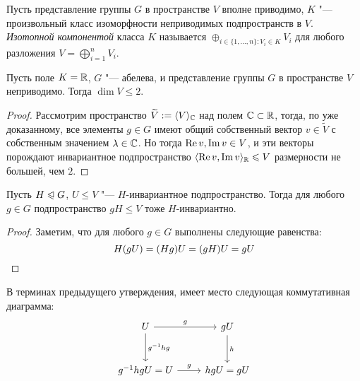 \begin{definition}
	Пусть представление группы $G$ в пространстве $V$ вполне приводимо, $K$ "--- произвольный класс изоморфности неприводимых подпространств в $V$. \textit{Изотопной компонентой} класса $K$ называется $\oplus_{i \in \{1, \dotsc, n\} : V_i \in K}V_i$ для любого разложения $V = \bigoplus_{i = 1}^nV_i$.
\end{definition}

\begin{proposition}
	Пусть поле $K = \mathbb{R}$, $G$ "--- абелева, и представление группы $G$ в пространстве $V$ неприводимо. Тогда $\dim {V} \le 2$.
\end{proposition}

\begin{proof}
	Рассмотрим пространство $\widetilde V := \langle V\rangle_{\mathbb{C}}$ над полем $\mathbb{C} \subset \mathbb{R}$, тогда, по уже доказанному, все элементы $g \in G$ имеют общий собственный вектор $v \in \widetilde V$ с собственным значением $\lambda \in \mathbb{C}$. Но тогда $\operatorname{Re}{v}, \operatorname{Im}{v} \in V$, и эти векторы порождают инвариантное подпространство $\langle \operatorname{Re}{v}, \operatorname{Im}{v}\rangle_{\mathbb{R}} \leqslant V$ размерности не большей, чем $2$.
\end{proof}

\begin{proposition}
	Пусть $H \trianglelefteqslant G$, $U \le V$ "--- $H$-инвариантное подпространство. Тогда для любого $g \in G$ подпространство $gH \le V$ тоже $H$-инвариантно.
\end{proposition}

\begin{proof}
	Заметим, что для любого $g \in G$ выполнены следующие равенства:
	\[H(gU) = (Hg)U = (gH)U = gU\qedhere\]
\end{proof}

\begin{note}
	В терминах предыдущего утверждения, имеет место следующая коммутативная диаграмма:
	\[
	\begin{tikzcd}[row sep = large]
		U \arrow{d}{g^{-1}hg} \arrow{r}{g} & gU \arrow{d}{h}\\
		g^{-1}hgU = U \arrow{r}{g} & hgU = gU
	\end{tikzcd}
	\]
\end{note}